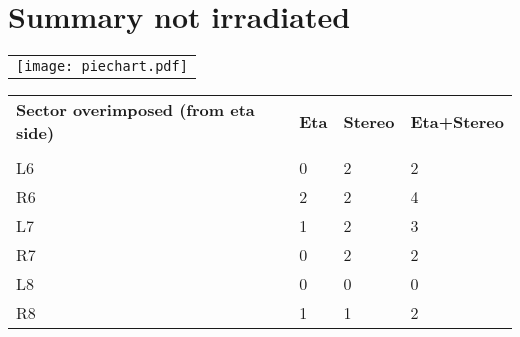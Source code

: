 \documentclass{article}%
\begin{document}
%
\section*{Summary not irradiated}%
\label{sec:Summary not irradiated}%
\begin{longtabu}{X[c]}%
\texttt{[image: piechart.pdf]}\\%
\end{longtabu}%
\renewcommand{\arraystretch}{1.5}%
\begin{longtabu}{X[l] X[r] X[r] X[r]}%
%
\textbf{Sector overimposed (from eta side)}&\textbf{Eta}&\textbf{Stereo}&\textbf{Eta+Stereo}\\%
&&&\\%
\hline%
%
L6&0&2&2\\%
R6&2&2&4\\%
%
L7&1&2&3\\%
R7&0&2&2\\%
%
L8&0&0&0\\%
R8&1&1&2\\%
\end{longtabu}

%
\newpage%
\end{document}
